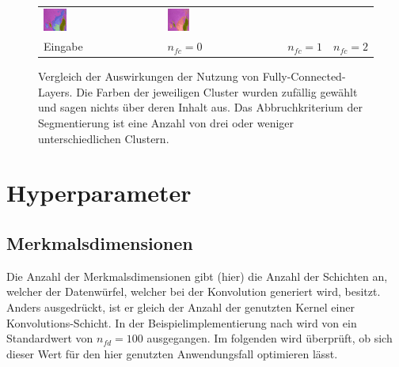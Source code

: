 \begin{figure}[h!]
\begin{tabular}{C{0.24\textwidth}C{0.24\textwidth}C{0.24\textwidth}C{0.24\textwidth}}
		\includegraphics[width=0.2\textwidth]{images/gen/fully_connected/p03_04.png_1.png} &
		\includegraphics[width=0.2\textwidth]{images/gen/fully_connected/p03_04.png_2.png} \\
		
		\hspace{2pt}\newline\centering Eingabe & 
		\hspace{2pt}\newline\centering $n_{fc}=0$ &
		\hspace{2pt}\newline\centering $n_{fc}=1$ &
		\hspace{2pt}\newline\centering $n_{fc}=2$ 
	\end{tabular}
	\caption{Vergleich der Auswirkungen der Nutzung von Fully-Connected-Layers. Die Farben der jeweiligen Cluster wurden zufällig gewählt und sagen nichts über deren Inhalt aus. Das Abbruchkriterium der Segmentierung ist eine Anzahl von drei oder weniger unterschiedlichen Clustern.}
	\label{fig:fc_comparision}
\end{figure}

\section{Hyperparameter}
\label{sec:hyperparameter}

\subsection{Merkmalsdimensionen}

Die Anzahl der Merkmalsdimensionen gibt (hier) die Anzahl der Schichten an, welcher der Datenwürfel, welcher bei der Konvolution generiert wird, besitzt. Anders ausgedrückt, ist er gleich der Anzahl der genutzten Kernel einer Konvolutions-Schicht. In der Beispielimplementierung nach \cite{kanezaki_18} wird von ein Standardwert von $n_{fd} = 100$ ausgegangen. Im folgenden wird überprüft, ob sich dieser Wert für den hier genutzten Anwendungsfall optimieren lässt.

